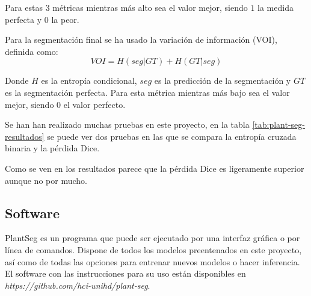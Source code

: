 Para estas 3 métricas mientras más alto sea el valor mejor, siendo $1$ la medida perfecta y $0$ la peor.

Para la segmentación final se ha usado la variación de información (VOI), definida como:
\begin{equation}
VOI = H(seg|GT) + H(GT|seg)
\end{equation}

Donde $H$ es la entropía condicional, $seg$ es la predicción de la segmentación y $GT$ es la segmentación perfecta. Para esta métrica mientras más bajo sea el valor mejor, siendo 0 el valor perfecto.

Se han han realizado muchas pruebas en este proyecto, en la tabla \ref{tab:plant-seg-resultados} se puede ver dos pruebas en las que se compara la entropía cruzada binaria y la pérdida Dice.


Como se ven en los resultados parece que la pérdida Dice es ligeramente superior aunque no por mucho.

\subsection{Software}

PlantSeg es un programa que puede ser ejecutado por una interfaz gráfica o por línea de comandos. Dispone de todos los modelos preentenados en este proyecto, así como de todas las opciones para entrenar nuevos modelos o hacer inferencia. El software con las instrucciones para su uso están disponibles en \textit{https://github.com/hci-unihd/plant-seg}.

